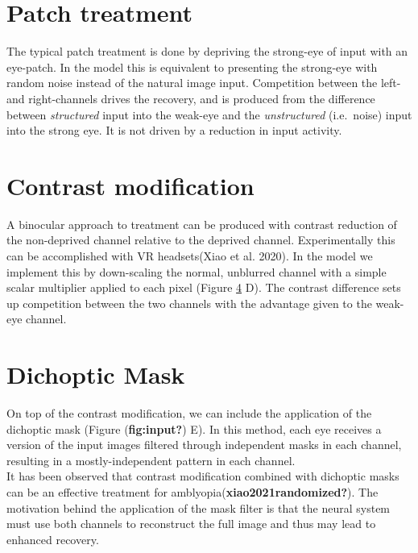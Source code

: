\documentclass[
  letterpaper,
  DIV=11,
  numbers=noendperiod]{scrreprt}
\begin{document}
\hypertarget{patch-treatment}{%
\section{Patch treatment}\label{patch-treatment}}

The typical patch treatment is done by depriving the strong-eye of input
with an eye-patch. In the model this is equivalent to presenting the
strong-eye with random noise instead of the natural image input.
Competition between the left- and right-channels drives the recovery,
and is produced from the difference between \emph{structured} input into
the weak-eye and the \emph{unstructured} (i.e.~noise) input into the
strong eye. It is not driven by a reduction in input activity.

\hypertarget{contrast-modification}{%
\section{Contrast modification}\label{contrast-modification}}

A binocular approach to treatment can be produced with contrast
reduction of the non-deprived channel relative to the deprived channel.
Experimentally this can be accomplished with VR headsets(Xiao et al.
2020). In the model we implement this by down-scaling the normal,
unblurred channel with a simple scalar multiplier applied to each pixel
(Figure \protect\hyperlink{fig:input}{4} D). The contrast difference
sets up competition between the two channels with the advantage given to
the weak-eye channel.

\hypertarget{dichoptic-mask}{%
\section{Dichoptic Mask}\label{dichoptic-mask}}

On top of the contrast modification, we can include the application of
the dichoptic mask (Figure (\textbf{fig:input?}) E). In this method,
each eye receives a version of the input images filtered through
independent masks in each channel, resulting in a mostly-independent
pattern in each channel.\\
It has been observed that contrast modification combined with dichoptic
masks can be an effective treatment for
amblyopia(\textbf{xiao2021randomized?}). The motivation behind the
application of the mask filter is that the neural system must use both
channels to reconstruct the full image and thus may lead to enhanced
recovery.
\end{document}
